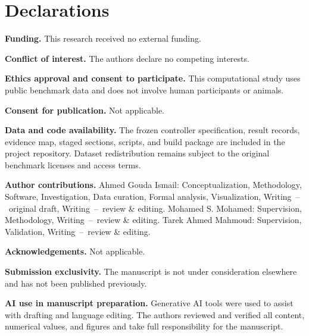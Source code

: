 \documentclass[pdflatex,sn-mathphys-num,iicol]{sn-jnl}
\begin{document}
\backmatter

\section*{Declarations}

\noindent\textbf{Funding.} This research received no external funding.

\noindent\textbf{Conflict of interest.} The authors declare no competing interests.

\noindent\textbf{Ethics approval and consent to participate.} This computational study uses public benchmark data and does not involve human participants or animals.

\noindent\textbf{Consent for publication.} Not applicable.

\noindent\textbf{Data and code availability.} The frozen controller specification, result records, evidence map, staged sections, scripts, and build package are included in the project repository. Dataset redistribution remains subject to the original benchmark licenses and access terms.

\noindent\textbf{Author contributions.} Ahmed Gouda Ismail: Conceptualization, Methodology, Software, Investigation, Data curation, Formal analysis, Visualization, Writing~--~original draft, Writing~--~review \& editing. Mohamed S. Mohamed: Supervision, Methodology, Writing~--~review \& editing. Tarek Ahmed Mahmoud: Supervision, Validation, Writing~--~review \& editing.

\noindent\textbf{Acknowledgements.} Not applicable.

\noindent\textbf{Submission exclusivity.} The manuscript is not under consideration elsewhere and has not been published previously.

\noindent\textbf{AI use in manuscript preparation.} Generative AI tools were used to assist with drafting and language editing. The authors reviewed and verified all content, numerical values, and figures and take full responsibility for the manuscript.


\end{document}
